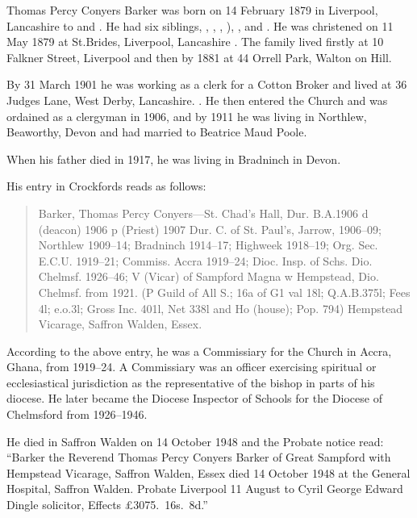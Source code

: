
Thomas Percy Conyers Barker was born on 14 February 1879 in Liverpool, Lancashire to  and .
He had six siblings, , , , ),
, and .
He was christened on 11 May 1879 at St.Brides, Liverpool, Lancashire  \cite{TPCBarkerBirth}. The family lived firstly at 10 Falkner Street, Liverpool  and then by 1881 at 44 Orrell Park, Walton on Hill. \cite{TPCBarkerResidence}

By 31 March 1901 he was working as a clerk for a Cotton Broker and lived at 36 Judges Lane, West Derby, Lancashire. \cite{TPCBarker1901}.  He then entered the Church and was ordained as a clergyman in 1906, and by 1911 he  was living in Northlew, Beaworthy, Devon  \cite{TPCBarker1911} and had married to Beatrice Maud Poole.

When his father died in 1917, he was living in Bradninch in Devon.\cite{THBdeathcert}

His entry in Crockfords reads as follows: \cite{TPCBarkerCrockfords}

\begin{quotation}
Barker, Thomas Percy Conyers---St. Chad's Hall, Dur. B.A.1906 d (deacon) 1906 p (Priest) 1907 Dur. C. of St. Paul's, Jarrow, 1906--09; Northlew 1909--14; Bradninch 1914--17; Highweek 1918--19; Org. Sec. E.C.U. 1919--21; Commiss. Accra 1919--24; Dioc. Insp. of Schs. Dio. Chelmsf. 1926--46; V (Vicar) of Sampford Magna w Hempstead, Dio. Chelmsf. from 1921. (P Guild of All S.; 16a of G1 val 18l; Q.A.B.375l; Fees 4l; e.o.3l; Gross Inc. 401l, Net 338l and Ho (house); Pop. 794) Hempstead Vicarage, Saffron Walden, Essex.
\end{quotation}

According to the above entry, he was a Commissiary for the Church in Accra, Ghana, from 1919--24.  A Commissiary was an officer exercising spiritual or ecclesiastical jurisdiction as the representative of the bishop in parts of his diocese.  He later became the Diocese Inspector of Schools for the Diocese of Chelmsford from 1926--1946.

He died in Saffron Walden on 14 October 1948 \cite{TPCBarkerDeath} and the Probate notice read: ``Barker the Reverend Thomas Percy Conyers Barker of Great Sampford with Hempstead Vicarage, Saffron Walden, Essex died 14 October 1948 at the General Hospital, Saffron Walden. Probate Liverpool 11 August to Cyril George Edward Dingle solicitor, Effects \pounds 3075.~16s.~8d.''
